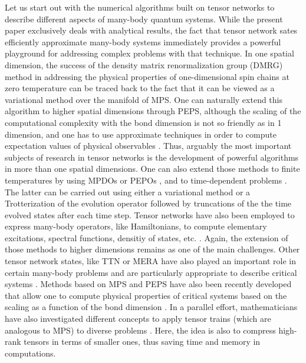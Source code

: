 \documentclass[rmp,aps,reprint,superscriptaddress,nobalancelastpage]{revtex4-1}
\begin{document}
Let us start out with the numerical algorithms built on tensor networks to describe different aspects of many-body quantum systems. While the present paper exclusively deals with analytical results, the fact that tensor network sates efficiently approximate many-body systems immediately provides a powerful playground for addressing complex problems with that technique. In one spatial dimension, the success of the density matrix renormalization group (DMRG) \cite{white:DMRG} method in addressing the physical properties of one-dimensional spin chains at zero temperature can be traced back to the fact that it can be viewed as a variational method over the manifold of MPS. One can naturally extend this algorithm to higher spatial dimensions through PEPS, although the scaling of the computational complexity with the bond dimension is not so friendly as in 1 dimension, and one has to use approximate techniques in order to compute expectation values of physical observables \cite{verstraete:2D-dmrg}. Thus, arguably the most important subjects of research in tensor networks is the development of powerful algorithms in more than one spatial dimensions. One can also extend those methods to finite temperatures by using MPDOs or PEPOs \cite{czarnik2015variational}, and to time-dependent problems \cite{czarnik2019time}. The latter can be carried out using either a variational method or a Trotterization of the evolution operator followed by truncations of the the time evolved states after each time step. Tensor networks have also been employed to express many-body operators, like Hamiltonians, to compute elementary excitations, spectral functions, densitiy of states, etc. \cite{pirvu2010matrix,mcculloch2007density}. Again, the extension of those methods to higher dimensions remains as one of the main challenges. Other tensor network states, like TTN or MERA have also played an important role in certain many-body problems and are particularly appropriate to describe critical systems \cite{evenbly2014algorithms,silvi2010homogeneous}. Methods based on MPS and PEPS have also been recently developed that allow one to compute physical properties of critical systems based on the scaling as a function of the bond dimension \cite{vanhecke2019scaling,tagliacozzo2008scaling,corboz2018finite,pirvu2012matrix,rader2018finite,stojevic2015conformal}. In a parallel effort, mathematicians have also investigated different concepts to apply tensor trains (which are analogous to MPS) to diverse problems \cite{oseledets2011tensor,hackbusch2012tensor,grasedyck2010hierarchical}. Here, the idea is also to compress high-rank tensors in terms of smaller ones, thus saving time and memory in computations.
\end{document}

